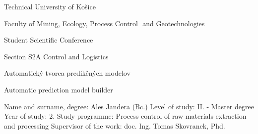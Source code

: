 \documentclass[12pt]{article}
\begin{document}
\usepackage[main=english,slovak]{babel}

\usepackage{listings}  %
\usepackage{qtree}
\usepackage{tikz-qtree}
\usepackage{graphicx}
\usepackage{subcaption}

\lstset{
    basicstyle=\small\ttfamily,  %
    showstringspaces=false       %
}



Technical University of Košice

Faculty of Mining, Ecology, Process Control  and Geotechnologies

Student Scientific Conference




Section S2A Control and Logistics




Automatický tvorca predikčných modelov

Automatic prediction model builder

Name and surname, degree: Ales Jandera (Bc.)
Level of study: II. - Master degree
Year of study: 2.
Study programme: Process control of raw materials extraction and processing 
Supervisor of the work: doc. Ing. Tomas Skovranek, Phd.
\end{document}
